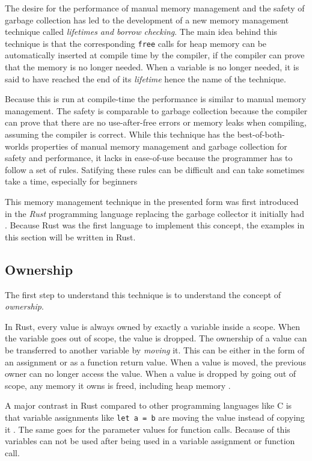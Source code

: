 The desire for the performance of manual memory management and the safety of garbage collection has led to the development
of a new memory management technique called \textit{lifetimes and borrow checking}.
The main idea behind this technique is that the corresponding \texttt{free} calls for heap memory can be automatically inserted
at compile time by the compiler, if the compiler can prove that the memory is no longer needed.
When a variable is no longer needed, it is said to have reached the end of its \textit{lifetime} hence the name of the technique.

Because this is run at compile-time the performance is similar to manual memory management.
The safety is comparable to garbage collection because the compiler can prove that there are no use-after-free errors
or memory leaks when compiling, assuming the compiler is correct.
While this technique has the best-of-both-worlds properties of manual memory management and garbage collection
for safety and performance, it lacks in ease-of-use because the programmer has to follow a set of rules.
Satifying these rules can be difficult and can take sometimes take a time, especially for beginners \cite{rust_usability}

This memory management technique in the presented form was first introduced in the \textit{Rust} programming language
\cite[1. Introduction]{rust_borrow_formalism_2021} replacing the garbage collector it initially had \cite{rust_gc_removal}.
Because Rust was the first language to implement this concept, the examples in this section will be written in Rust.

\subsection{Ownership}

The first step to understand this technique is to understand the concept of \textit{ownership}.

In Rust, every value is always owned by exactly a variable inside a scope.
When the variable goes out of scope, the value is dropped.
The ownership of a value can be transferred to another variable by \textit{moving} it.
This can be either in the form of an assignment or as a function return value.
When a value is moved, the previous owner can no longer access the value.
When a value is dropped by going out of scope, any memory it owns is freed, including heap memory \cite[59-61]{rust_book_2019}.

A major contrast in Rust compared to other programming languages like C
is that variable assignments like \texttt{let a = b} are moving the value
instead of copying it \cite[2.2 Ownership]{rust_borrow_formalism_2021}. The same goes for the parameter values for function calls.
Because of this variables can not be used after being used in a variable assignment or function call.

